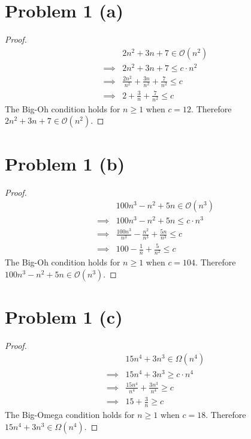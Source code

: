 \documentclass{article}
\newenvironment{problem}[1]{
  \nobreak\section*{Problem #1}
}{}
\newcommand*{\bigO}[1]{\ensuremath{\mathcal{O}\left(#1\right)}}
\newcommand*{\bigOmega}[1]{\ensuremath{\Omega\left(#1\right)}}
\begin{document}
  \begin{problem}{1 (a)}
    \begin{proof}
      \begin{equation*}
        \begin{split}
          & 2n^2 + 3n + 7 \in \bigO{n^2} \\
          \implies & 2n^2 + 3n + 7 \le c \cdot n^2 \\
          \implies & \frac{2n^2}{n^2} + \frac{3n}{n^2} + \frac{7}{n^2} \le c \\
          \implies & 2 + \frac{3}{n} + \frac{7}{n^2} \le c
        \end{split}
      \end{equation*}
      The Big-Oh condition holds for $n \ge 1$ when $c = 12$.  Therefore $2n^2 + 3n + 7 \in \bigO{n^2}$. 
    \end{proof}
  \end{problem}

  \begin{problem}{1 (b)}
    \begin{proof}
      \begin{equation*}
        \begin{split}
          & 100n^3 - n^2 + 5n \in \bigO{n^3} \\
          \implies & 100n^3 - n^2 + 5n \le c \cdot n^3 \\
          \implies & \frac{100n^3}{n^3} - \frac{n^2}{n^3} + \frac{5n}{n^3} \le c \\
          \implies & 100 - \frac{1}{n} + \frac{5}{n^2} \le c
        \end{split}
      \end{equation*}
      The Big-Oh condition holds for $n \ge 1$ when $c = 104$.  Therefore $100n^3 - n^2 + 5n \in \bigO{n^3}$.
    \end{proof}
  \end{problem}

  \begin{problem}{1 (c)}
    \begin{proof}
      \begin{equation*}
        \begin{split}
          & 15n^4 + 3n^3 \in \bigOmega{n^4} \\
          \implies & 15n^4 + 3n^3 \ge c \cdot n^4 \\
          \implies & \frac{15n^4}{n^4} + \frac{3n^3}{n^4} \ge c \\
          \implies & 15 + \frac{3}{n} \ge c
        \end{split}
      \end{equation*}
      The Big-Omega condition holds for $n \ge 1$ when $c = 18$.  Therefore $15n^4 + 3n^3 \in \bigOmega{n^4}$.
    \end{proof}
  \end{problem}
\end{document}
